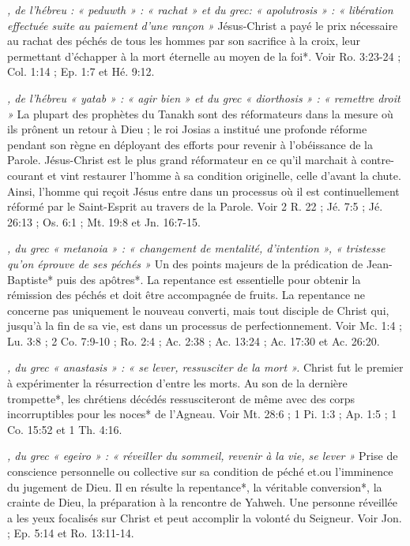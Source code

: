 \begin{multicols}{2}
{\textit{, de l'hébreu : « peduwth » : « rachat » et du grec: « apolutrosis » : « libération effectuée suite au paiement d'une rançon »}\newline
Jésus-Christ a payé le prix nécessaire au rachat des péchés de tous les hommes par son sacrifice à la croix, leur permettant d'échapper à la mort éternelle au moyen de la foi*. Voir Ro. 3:23-24 ; Col. 1:14 ; Ep. 1:7 et Hé. 9:12.

\textit{, de l'hébreu « yatab » : « agir bien » et du grec « diorthosis » : « remettre droit »}\newline
La plupart des prophètes du Tanakh sont des réformateurs dans la mesure où ils prônent un retour à Dieu ; le roi Josias a institué une profonde réforme pendant son règne en déployant des efforts pour revenir à l'obéissance de la Parole. Jésus-Christ est le plus grand réformateur en ce qu'il marchait à contre-courant et vint restaurer l'homme à sa condition originelle, celle d'avant la chute. Ainsi, l'homme qui reçoit Jésus entre dans un processus où il est continuellement réformé par le Saint-Esprit au travers de la Parole. Voir 2 R. 22 ; Jé. 7:5 ; Jé. 26:13 ; Os. 6:1 ; Mt. 19:8 et Jn. 16:7-15.

\textit{, du grec « metanoia » : « changement de mentalité, d'intention », « tristesse qu'on éprouve de ses péchés »}\newline
Un des points majeurs de la prédication de Jean-Baptiste* puis des apôtres*. La repentance est essentielle pour obtenir la rémission des péchés et doit être accompagnée de fruits. La repentance ne concerne pas uniquement le nouveau converti, mais tout disciple de Christ qui, jusqu'à la fin de sa vie, est dans un processus de perfectionnement. Voir Mc. 1:4 ; Lu. 3:8 ; 2 Co. 7:9-10 ; Ro. 2:4 ; Ac. 2:38 ; Ac. 13:24 ; Ac. 17:30 et Ac. 26:20.

\textit{, du grec « anastasis » : « se lever, ressusciter de la mort ».}\newline
Christ fut le premier à expérimenter la résurrection d'entre les morts. Au son de la dernière trompette*, les chrétiens décédés ressusciteront de même avec des corps incorruptibles pour les noces* de l'Agneau. Voir Mt. 28:6 ; 1 Pi. 1:3 ; Ap. 1:5 ; 1 Co. 15:52 et 1 Th. 4:16.

\textit{, du grec « egeiro » : « réveiller du sommeil, revenir à la vie, se lever »}\newline
Prise de conscience personnelle ou collective sur sa condition de péché et.ou l'imminence du jugement de Dieu. Il en résulte la repentance*, la véritable conversion*, la crainte de Dieu, la préparation à la rencontre de Yahweh. Une personne réveillée a les yeux focalisés sur Christ et peut accomplir la volonté du Seigneur. Voir Jon. ; Ep. 5:14 et Ro. 13:11-14.

}
\end{multicols}
